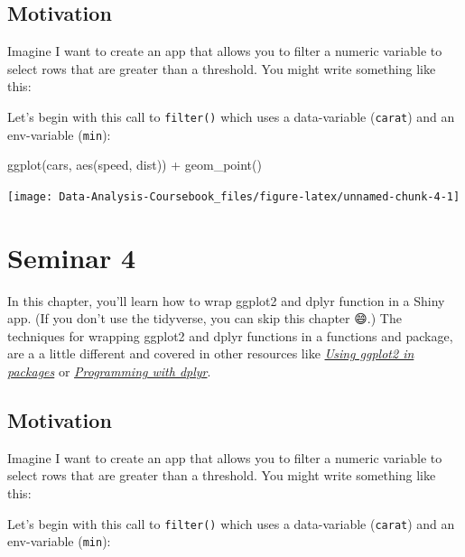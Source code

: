 \documentclass[
]{article}
\newenvironment{Shaded}{\begin{snugshade}}{\end{snugshade}}
\newcommand{\FunctionTok}[1]{\textcolor[rgb]{0.00,0.00,0.00}{#1}}
\newcommand{\NormalTok}[1]{#1}
\newcommand{\SpecialCharTok}[1]{\textcolor[rgb]{0.00,0.00,0.00}{#1}}
\begin{document}
\hypertarget{tidy-motivation}{%
\subsection{Motivation}\label{tidy-motivation}}

Imagine I want to create an app that allows you to filter a numeric variable to select rows that are greater than a threshold.
You might write something like this:

Let's begin with this call to \texttt{filter()} which uses a data-variable (\texttt{carat}) and an env-variable (\texttt{min}):

\begin{Shaded}
\begin{Highlighting}[]
\FunctionTok{ggplot}\NormalTok{(cars, }\FunctionTok{aes}\NormalTok{(speed, dist)) }\SpecialCharTok{+} 
  \FunctionTok{geom\_point}\NormalTok{()}
\end{Highlighting}
\end{Shaded}

\begin{center}\texttt{[image: Data-Analysis-Coursebook\_files/figure-latex/unnamed-chunk-4-1]} \end{center}

\hypertarget{seminar4}{%
\section{Seminar 4}\label{seminar4}}

In this chapter, you'll learn how to wrap ggplot2 and dplyr function in a Shiny app.
(If you don't use the tidyverse, you can skip this chapter 😄.) The techniques for wrapping ggplot2 and dplyr functions in a functions and package, are a a little different and covered in other resources like \href{http://ggplot2.tidyverse.org/dev/articles/ggplot2-in-packages.html}{\emph{Using ggplot2 in packages}} or \href{http://dplyr.tidyverse.org/articles/programming.html}{\emph{Programming with dplyr}}.

\hypertarget{tidy-motivation}{%
\subsection{Motivation}\label{tidy-motivation}}

Imagine I want to create an app that allows you to filter a numeric variable to select rows that are greater than a threshold.
You might write something like this:

Let's begin with this call to \texttt{filter()} which uses a data-variable (\texttt{carat}) and an env-variable (\texttt{min}):
\end{document}
